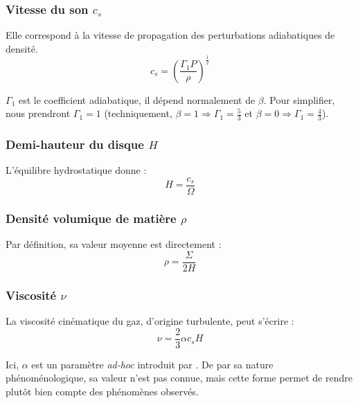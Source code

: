 \subsubsection{\texorpdfstring{Vitesse du son $c_s$}{Vitesse du son cs}}

Elle correspond à la vitesse de propagation des perturbations adiabatiques de
densité.
\begin{equation}
    \label{eq:vitesse_son}
    c_s = \left( \frac{\Gamma_1 P}{\rho} \right)^\frac{1}{2}
\end{equation}

$\Gamma_1$ est le coefficient adiabatique, il dépend normalement de $\beta$.
Pour simplifier, nous prendront $\Gamma_1 = 1$ (techniquement, $\beta = 1
\Rightarrow \Gamma_1 = \frac{5}{3}$ et $\beta = 0 \Rightarrow \Gamma_1
= \frac{4}{3}$).

\subsubsection{\texorpdfstring{Demi-hauteur du disque $H$}{Demi-hauteur du disque H}}

L’équilibre hydrostatique donne :
\begin{equation}
    \label{eq:hauteur}
    H = \frac{c_s}{\Omega}
\end{equation}

\subsubsection{\texorpdfstring{Densité volumique de matière $\rho$}{Densité volumique de matière ρ}}

Par définition, sa valeur moyenne est directement :
\begin{equation}
    \label{eq:densite}
    \rho = \frac{\Sigma}{2 H}
\end{equation}

\subsubsection{\texorpdfstring{Viscosité $\nu$}{Viscosité ν}}

La viscosité cinématique du gaz, d’origine turbulente, peut s’écrire :
\begin{equation}
    \label{eq:viscosite}
    \nu = \frac{2}{3} \alpha c_s H
\end{equation}

Ici, $\alpha$ est un paramètre \textit{ad-hoc} introduit par \citet{1973}. De
par sa nature phénoménologique, sa valeur n’est pas connue, mais cette forme
permet de rendre plutôt bien compte des phénomènes observés.

